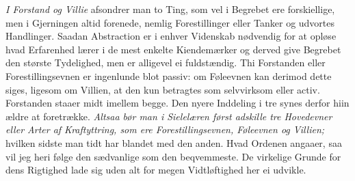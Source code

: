 \documentclass[12pt,a4paper]{article}
\newcommand{\opage}[1]{\marginnote{\footnotesize\textit{[#1]}}}
\begin{document}
\emph{I Forstand og Villie} afsondrer man to Ting, som vel i Begrebet ere
forskiellige, men i Gjerningen altid forenede, nemlig Forestillinger eller Tanker
og udvortes Handlinger. Saadan Abstraction er i enhver Videnskab nødvendig for at
opløse hvad Erfarenhed lærer i de mest enkelte Kiendemærker og derved give Begrebet
den største Tydelighed, men er alligevel ei fuldstændig. Thi Forstanden eller
Forestillingsevnen er ingenlunde blot passiv: om Føleevnen kan derimod dette
\opage{32} siges, ligesom om Villien, at den kun betragtes som selvvirksom eller activ.
Forstanden staaer midt imellem begge. Den nyere Inddeling i tre synes derfor hiin
ældre at foretrække. \emph{Altsaa bør man i Sielelæren først adskille tre
Hovedevner eller Arter af Kraftyttring, som ere Forestillingsevnen, Føleevnen og
Villien;} hvilken sidste man tidt har blandet med den anden. Hvad Ordenen angaaer,
saa vil jeg heri følge den sædvanlige som den beqvemmeste. De virkelige Grunde for
dens Rigtighed lade sig uden alt for megen Vidtløftighed her ei udvikle.
\end{document}
